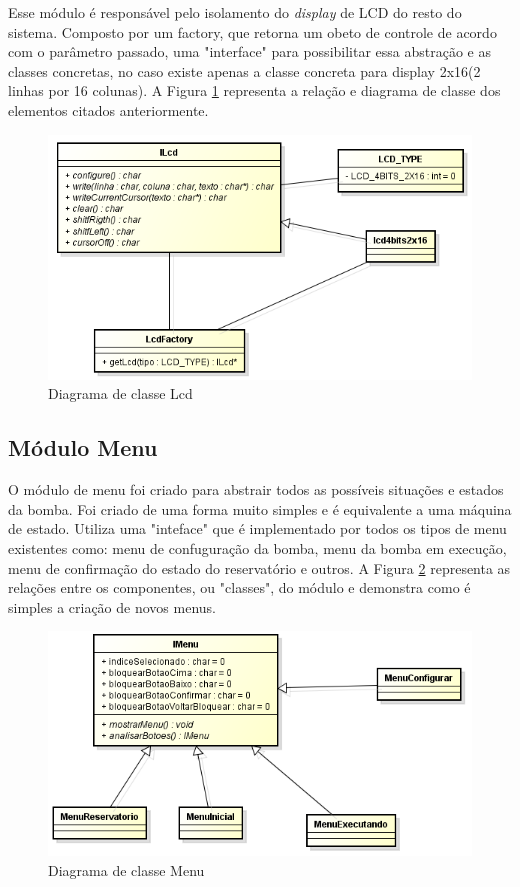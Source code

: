 Esse módulo é responsável pelo isolamento do \emph{display} de LCD do resto do sistema. Composto por um factory, que retorna um obeto de controle de acordo com o parâmetro passado, uma "interface" para possibilitar essa abstração e as classes concretas, no caso existe apenas a classe concreta para display 2x16(2 linhas por 16 colunas). A Figura \ref{fig:diagramalcd} representa a relação e diagrama de classe dos elementos citados anteriormente.

\begin{figure}[htp]
	\centering
	\includegraphics[scale=0.8]{images/classe_lcd.png}
	\caption{Diagrama de classe Lcd}	
	\label{fig:diagramalcd}
\end{figure}

\subsection{Módulo Menu}

O módulo de menu foi criado para abstrair todos as possíveis situações e estados da bomba. Foi criado de uma forma muito simples e é equivalente a uma máquina de estado. Utiliza uma "inteface" que é implementado por todos os tipos de menu existentes como: menu de confuguração da bomba, menu da bomba em execução, menu de confirmação do estado do reservatório e outros. A Figura \ref{fig:classemenu} representa as relações entre os componentes, ou "classes", do módulo e demonstra como é simples a criação de novos menus.

\begin{figure}[htp]
	\centering
	\includegraphics[scale=1]{images/classe_menu.png}
	\caption{Diagrama de classe Menu}	
	\label{fig:classemenu}
\end{figure}

